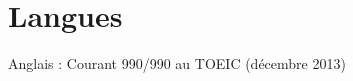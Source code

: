 \documentclass[11pt,a4paper,sans]{moderncv} %
\begin{document}


\section{Langues}

\cvitemwithcomment
    {}
    {Anglais : Courant}
    {990/990 au TOEIC (décembre 2013)}
\end{document}
